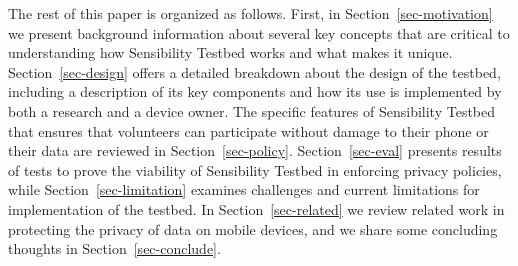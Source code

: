 The rest of this paper is organized as follows. First, in Section~\ref{sec-motivation} we
present background information about several key concepts that are
critical to understanding how Sensibility Testbed works and what makes
it unique. Section~\ref{sec-design} offers a detailed breakdown about the design of
the testbed, including a description of its key components and how its
use is implemented by both a research and a device owner. The specific
features of Sensibility Testbed that ensures that volunteers can
participate without damage to their phone or their data are reviewed
in Section~\ref{sec-policy}. Section~\ref{sec-eval} presents results of tests to prove the
viability of Sensibility Testbed in enforcing privacy policies, while
Section~\ref{sec-limitation} examines challenges and current limitations for
implementation of the testbed. In Section~\ref{sec-related} we review related work
in protecting the privacy of data on mobile devices, and we share some
concluding thoughts in Section~\ref{sec-conclude}.

